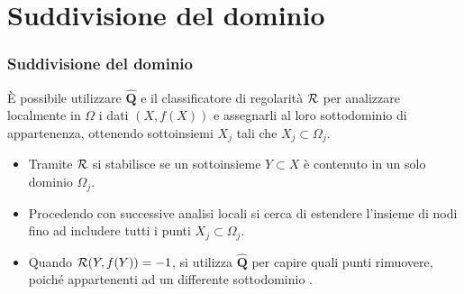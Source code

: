 \documentclass[10pt]{beamer}
\theoremstyle{definition}
\theoremstyle{plain}
\def\R{\mathbb R}
\def\Cal#1{{\cal #1}}
\def\line#1{\hbox to\hsize{#1}}
\begin{document}
\section{Suddivisione del dominio}
\begin{frame}
\frametitle{Suddivisione del dominio}


È possibile utilizzare $\widehat{\bm Q}$ e il classificatore di regolarità $\Cal R$ per analizzare localmente in $\Omega$ i dati $(X, f(X))$ e assegnarli al loro sottodominio di appartenenza, ottenendo sottoinsiemi $X_j$ tali che $X_j\subset \Omega_j$.

\medskip

\begin{itemize} 
\item
Tramite $\Cal R$ si stabilisce se un sottoinsieme $Y \subset X$ è contenuto in un solo dominio $\Omega_j$.

\medskip

\item
Procedendo con successive analisi locali si cerca di estendere l’insieme di nodi fino ad includere tutti i punti $X_j\subset\Omega_j$.

\medskip

\item
Quando $\Cal R(Y, f(Y)) = -1$, si utilizza $\widehat{\bm Q}$ per capire quali punti rimuovere, poiché  appartenenti ad un differente  sottodominio .
\end{itemize}
\end{frame}


\end{document}
